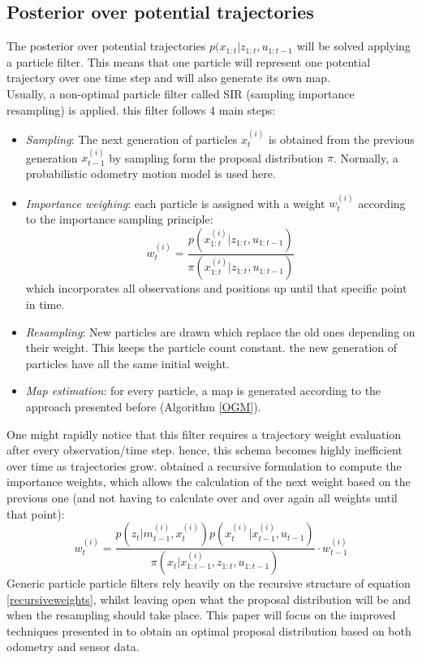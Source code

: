 \documentclass[letterpaper]{article}
\begin{document}
\subsection{Posterior over potential trajectories}
The posterior over potential trajectories $p(x_{1:t}|z_{1:t}, u_{1:t-1}$ will be solved applying a particle filter. This means that one particle will represent one potential trajectory over one time step and will also generate its own map.\\
Usually, a non-optimal particle filter called SIR (sampling importance resampling) is applied. this filter follows 4 main steps:
\begin{itemize}
	\item \textit{Sampling}: The next generation of particles $x_t^{(i)}$ is obtained from the previous generation $x_{t-1}^{(i)}$ by sampling form the proposal distribution $\pi$. Normally, a probabilistic odometry motion model is used here.
	\item \textit{Importance weighing}: each particle is assigned with a weight $w_t^{(i)}$ according to the importance sampling principle:
	\begin{equation}
		w_t^{(i)}=\frac{p(x_{1:t}^{(i)}|z_{1:t}, u_{1:t-1})}{\pi(x_{1:t}^{(i)}|z_{1:t}, u_{1:t-1})}
	\end{equation}
	which incorporates all observations and positions up until that specific point in time.
	\item \textit{Resampling}: New particles are drawn which replace the old ones depending on their weight. This keeps the particle count constant. the new generation of particles have all the same initial weight.
	\item \textit{Map estimation}: for every particle, a map is generated according to the approach presented before (Algorithm \ref{OGM}).
\end{itemize}
One might rapidly notice that this filter requires a trajectory weight evaluation after every observation/time step. hence, this schema becomes highly inefficient over time as trajectories grow. \cite{Weights}  obtained a recursive formulation to compute the importance weights, which allows the calculation of the next weight based on the previous one (and not having to calculate over and over again all weights until that point):
\begin{equation}
\label{recursiveweights}
	w_t^{(i)}= \frac{p(z_t|m_{t-1}^{(i)}, x_t^{(i)})p(x_t^{(i)}|x_{t-1}^{(i)}, u_{t-1})}{\pi(x_t | x_{1:t-1}^{(i)}, z_{1:t},u_{1:t-1})} \cdot w_{t-1}^{(i)}
\end{equation}
Generic particle particle filters rely heavily on the recursive structure of equation \ref{recursiveweights}, whilst leaving open what the proposal distribution will be and when the resampling should take place. This paper will focus on the improved techniques presented in \cite{Cyrill} to obtain an optimal proposal distribution based on both odometry and sensor data.
\end{document}
